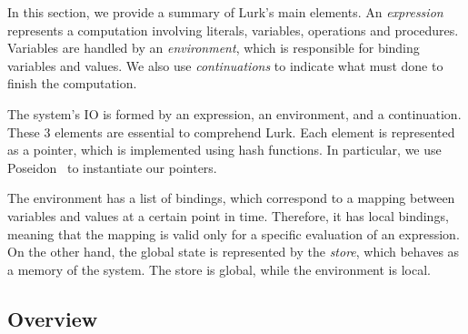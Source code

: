 \documentclass[10pt, english]{article}
\begin{document}
In this section, we provide a summary of Lurk's main elements. An \textit{expression} represents a computation involving literals, variables, operations and procedures. Variables are handled by an \textit{environment}, which is responsible for binding variables and values. We also use \textit{continuations} to indicate what must done to finish the computation.

The system's IO is formed by an expression, an environment, and a continuation. These 3 elements are essential to comprehend Lurk. Each element is represented as a pointer, which is implemented using hash functions. In particular, we use Poseidon~\cite{poseidon} to instantiate our pointers.

The environment has a list of bindings, which correspond to a mapping between variables and values at a certain point in time. Therefore, it has local bindings, meaning that the mapping is valid only for a specific evaluation of an expression. On the other hand, the global state is represented by the \textit{store}, which behaves as a memory of the system. The store is global, while the environment is local.

\subsection{Overview}
\end{document}
